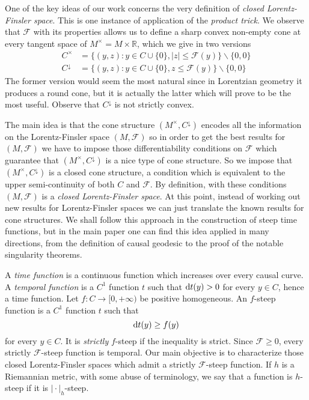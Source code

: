 \documentclass[a4paper]{jpconf}
\theoremstyle{definition}
\theoremstyle{remark}
\newcommand{\dd}{{\rm d}}
\begin{document}
One of the key ideas of our work concerns the very definition of {\em closed Lorentz-Finsler space}. This is one instance of application of the {\em product trick}. We observe that $\mathscr{F}$ with its properties allows us to define a sharp convex non-empty cone at every tangent space of $M^\times=M\times \mathbb{R}$, which we give in two versions
\begin{align}
C^\times&=\{(y,z)\colon y\in C\cup \{0\}, \vert z\vert\le \mathscr{F}(y)\} \backslash\{0,0\} \\
C^\downarrow &=\{(y,z)\colon y\in C\cup \{0\}, z\le \mathscr{F}(y)\} \backslash\{0,0\} \label{ana}
\end{align}
The former version would seem the most natural since in Lorentzian geometry it produces a round cone, but it is actually the latter which will prove to be the most useful. Observe that $C^\downarrow$ is not strictly convex.

The main idea is that the cone structure $(M^\times,C^\downarrow)$ encodes all the information on the Lorentz-Finsler space $(M,\mathscr{F})$ so in order to get the best results for $(M,\mathscr{F})$ we have to impose those differentiability conditions on $\mathscr{F}$ which guarantee that $(M^\times,C^\downarrow)$ is a nice type of cone structure. So we impose that $(M^\times,C^\downarrow)$ is a closed cone structure, a condition which is  equivalent to  the upper semi-continuity of both $C$ and $\mathscr{F}$. By definition, with these conditions $(M,\mathscr{F})$ is a {\em closed Lorentz-Finsler space}. At this point, instead of working out new results for Lorentz-Finsler spaces we can just translate the known results for cone structures.
We shall follow this approach in the construction of steep time functions, but in the main paper one can find this idea applied in many directions, from the definition of causal geodesic to the proof of the notable singularity theorems.


A {\em time function} is a continuous function which increases over every causal curve. A {\em temporal function} is a $C^1$ function $t$ such that $\dd t(y)>0$ for every $y\in C$, hence a time function. Let $f\colon C\to [0,+\infty)$ be positive homogeneous. An $f$-steep function is a $C^1$ function $t$ such that
 \begin{equation}
\dd t(y)\ge f(y)
\end{equation}
for every $y\in C$. It is {\em strictly} $f$-steep if the inequality is strict. Since $\mathscr{F}\ge 0$, every strictly $\mathscr{F}$-steep function is temporal. Our main objective is to characterize those closed Lorentz-Finsler spaces which admit a strictly  $\mathscr{F}$-steep function. If $h$ is a Riemannian metric, with some abuse of terminology, we say that a function is $h$-steep if it is $\vert \cdot\vert_h$-steep.
\end{document}
